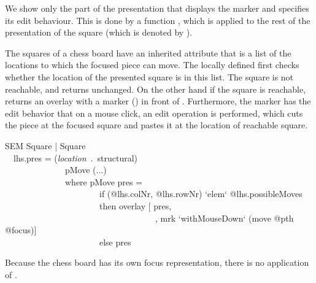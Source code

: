 We show only the part of the presentation that displays the marker and specifies its edit behaviour. This is done by a function , which is applied to the rest of the presentation of the square (which is denoted by ).

The squares of a chess board have an inherited attribute  that is a list of the locations to which the focused piece can move. The locally defined  first checks whether the location of the presented square  is in this list. The square is not reachable, and  returns   unchanged. On the other hand if the square is reachable,  returns an overlay with a marker () in front of . Furthermore, the marker has the edit behavior that on a mouse click, an edit operation  is performed, which cuts the piece at the focused square and pastes it at the location of reachable square.
 
\ttfamily\begin{small}\begin{tabbing}
SEM Square | Square\\
~~lhs.pres = ({\em location}~.~structural)\\
~~~~~~~~~~~~~~pMove (...)\\
~~~~~~~~~~~~~~where pMove pres =\\
~~~~~~~~~~~~~~~~~~~~~~if (@lhs.colNr, @lhs.rowNr) `elem` @lhs.possibleMoves\\
~~~~~~~~~~~~~~~~~~~~~~then overlay [ pres,\\
~~~~~~~~~~~~~~~~~~~~~~~~~~~~~~~~~~~, mrk `withMouseDown` (move @pth @focus)]\\
~~~~~~~~~~~~~~~~~~~~~~else pres\\
\end{tabbing}\end{small}\rmfamily

Because the chess board has its own focus representation, there is no application of .



